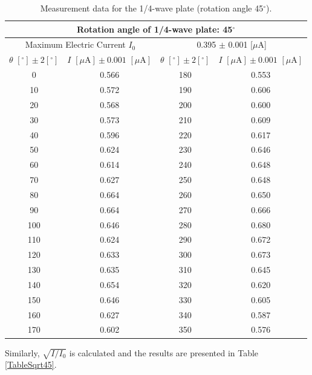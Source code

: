 \documentclass{article}
\begin{document}
\begin{table}[H]\centering
\begin{tabular}{cc||cc}
\multicolumn{4}{c}{Rotation angle of 1/4-wave plate: 45$^\circ$}\\
\toprule
\multicolumn{2}{c}{Maximum Electric Current $I_0$} & \multicolumn{2}{c}{0.395 $\pm$ 0.001 [$\mu$A]}\\
\midrule
$\theta\,\,[^\circ] \pm 2[^\circ]$ & $I\,\,[\mu\text{A}] \pm 0.001\,\,[\mu\text{A}]$ & $\theta\,\,[^\circ] \pm 2[^\circ]$ & $I\,\,[\mu\text{A}] \pm 0.001\,\,[\mu\text{A}]$\\
\midrule
0 & 0.566 & 180 & 0.553 \\
10 & 0.572 & 190 & 0.606 \\
20 & 0.568 & 200 & 0.600 \\
30 & 0.573 & 210 & 0.609 \\
40 & 0.596 & 220 & 0.617 \\
50 & 0.624 & 230 & 0.646 \\
60 & 0.614 & 240 & 0.648 \\
70 & 0.627 & 250 & 0.648 \\
80 & 0.664 & 260 & 0.650 \\
90 & 0.664 & 270 & 0.666 \\
100 & 0.646 & 280 & 0.680 \\
110 & 0.624 & 290 & 0.672 \\
120 & 0.633 & 300 & 0.673 \\
130 & 0.635 & 310 & 0.645 \\
140 & 0.654 & 320 & 0.620 \\
150 & 0.646 & 330 & 0.605 \\
160 & 0.627 & 340 & 0.587 \\
170 & 0.602 & 350 & 0.576  \\
\bottomrule
\end{tabular}
\caption{Measurement data for the 1/4-wave plate (rotation angle 45$^\circ$).}\label{Table1/445}
\end{table}

Similarly, $\sqrt{I/I_0}$ is calculated and the results are presented in Table \ref{TableSqrt45}.
\end{document}
